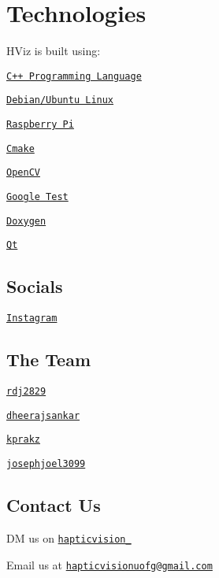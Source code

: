 \section*{Technologies}

H\+Viz is built using\+:


\begin{DoxyItemize}
\item \href{https://www.cplusplus.com/}{\tt C++ Programming Language}
\item \href{https://www.linux.org/}{\tt Debian/\+Ubuntu Linux}
\item \href{https://www.raspberrypi.org}{\tt Raspberry Pi}
\item \href{https://cmake.org/}{\tt Cmake}
\item \href{https://opencv.org/}{\tt Open\+CV}
\item \href{https://github.com/google/googletest}{\tt Google Test}
\item \href{https://www.doxygen.nl/index.html}{\tt Doxygen}
\item \href{https://www.qt.io/}{\tt Qt}
\end{DoxyItemize}

\subsection*{Socials}


\begin{DoxyItemize}
\item \href{https://www.instagram.com/hapticvision_/}{\tt Instagram}
\end{DoxyItemize}

\subsection*{The Team}


\begin{DoxyItemize}
\item \href{https://github.com/rdj2829}{\tt rdj2829}
\item \href{https://github.com/dheerajsankar}{\tt dheerajsankar}
\item \href{https://github.com/kprakz}{\tt kprakz}
\item \href{https://github.com/josephjoel3099}{\tt josephjoel3099}
\end{DoxyItemize}

\subsection*{Contact Us}


\begin{DoxyItemize}
\item DM us on \href{https://www.instagram.com/hapticvision_/}{\tt hapticvision\+\_\+}
\item Email us at \href{mailto:hapticvisionuofg@gmail.com}{\tt hapticvisionuofg@gmail.\+com} 
\end{DoxyItemize}